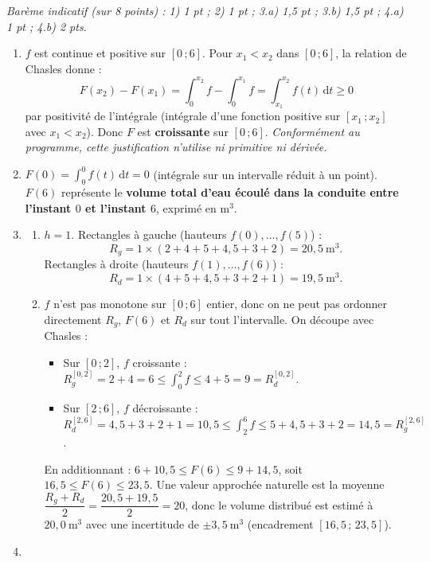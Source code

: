 \documentclass[11pt]{article}
\begin{document}
\begin{corrige}
\emph{Barème indicatif (sur 8 points) : 1) 1 pt ; 2) 1 pt ; 3.a) 1,5 pt ; 3.b) 1,5 pt ; 4.a) 1 pt ; 4.b) 2 pts.}
\begin{enumerate}
\item $f$ est continue et positive sur $[0\,;6]$. Pour $x_1 < x_2$ dans $[0\,;6]$, la relation de Chasles donne :
\[
F(x_2) - F(x_1) = \int_0^{x_2} f - \int_0^{x_1} f = \int_{x_1}^{x_2} f(t)\,\mathrm{d}t \ge 0
\]
par positivité de l'intégrale (intégrale d'une fonction positive sur $[x_1\,;x_2]$ avec $x_1<x_2$). Donc $F$ est \textbf{croissante} sur $[0\,;6]$. \emph{Conformément au programme, cette justification n'utilise ni primitive ni dérivée.}
\item $F(0) = \displaystyle\int_0^0 f(t)\,\mathrm{d}t = \boxed{0}$ (intégrale sur un intervalle réduit à un point). $F(6)$ représente le \textbf{volume total d'eau écoulé dans la conduite entre l'instant $0$ et l'instant $6$}, exprimé en $\mathrm{m}^3$.
\item \begin{enumerate}
\item $h=1$. Rectangles à gauche (hauteurs $f(0),\dots,f(5)$) :
\[
R_g = 1\times(2+4+5+4{,}5+3+2) = \boxed{20{,}5\ \mathrm{m}^3}.
\]
Rectangles à droite (hauteurs $f(1),\dots,f(6)$) :
\[
R_d = 1\times(4+5+4{,}5+3+2+1) = \boxed{19{,}5\ \mathrm{m}^3}.
\]
\item $f$ n'est pas monotone sur $[0\,;6]$ entier, donc on ne peut pas ordonner directement $R_g$, $F(6)$ et $R_d$ sur tout l'intervalle. On découpe avec Chasles :
\begin{itemize}
\item Sur $[0\,;2]$, $f$ croissante : $R_g^{[0,2]} = 2+4 = 6 \le \displaystyle\int_0^2 f \le 4+5 = 9 = R_d^{[0,2]}$.
\item Sur $[2\,;6]$, $f$ décroissante : $R_d^{[2,6]} = 4{,}5+3+2+1 = 10{,}5 \le \displaystyle\int_2^6 f \le 5+4{,}5+3+2 = 14{,}5 = R_g^{[2,6]}$.
\end{itemize}
En additionnant : $6+10{,}5 \le F(6) \le 9+14{,}5$, soit $\boxed{16{,}5 \le F(6) \le 23{,}5}$.
Une valeur approchée naturelle est la moyenne $\dfrac{R_g+R_d}{2} = \dfrac{20{,}5+19{,}5}{2} = 20$, donc le volume distribué est estimé à $\boxed{20{,}0\ \mathrm{m}^3}$ avec une incertitude de $\pm 3{,}5\ \mathrm{m}^3$ (encadrement $[16{,}5\,;\,23{,}5]$).
\end{enumerate}
\item \begin{enumerate}

\end{enumerate}
\end{enumerate}
\end{corrige}
\end{document}
